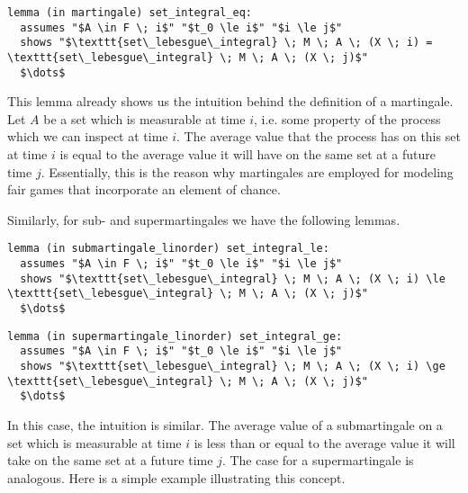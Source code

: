 \begin{isalemma}
{\small
\begin{lstlisting}[style=isabelle]
lemma (in martingale) set_integral_eq:
  assumes "$A \in F \; i$" "$t_0 \le i$" "$i \le j$"
  shows "$\texttt{set\_lebesgue\_integral} \; M \; A \; (X \; i) = \texttt{set\_lebesgue\_integral} \; M \; A \; (X \; j)$"
  $\dots$
\end{lstlisting}
}
\end{isalemma}

This lemma already shows us the intuition behind the definition of a martingale. Let $A$ be a set which is measurable at time $i$, i.e. some property of the process which we can inspect at time $i$. The average value that the process has on this set at time $i$ is equal to the average value it will have on the same set at a future time $j$. Essentially, this is the reason why martingales are employed for modeling fair games that incorporate an element of chance. 

Similarly, for sub- and supermartingales we have the following lemmas.

\begin{isalemma}
{\small
\begin{lstlisting}[style=isabelle]
lemma (in submartingale_linorder) set_integral_le:
  assumes "$A \in F \; i$" "$t_0 \le i$" "$i \le j$"
  shows "$\texttt{set\_lebesgue\_integral} \; M \; A \; (X \; i) \le \texttt{set\_lebesgue\_integral} \; M \; A \; (X \; j)$"
  $\dots$
\end{lstlisting}
}
\end{isalemma}

\begin{isalemma}
{\small
\begin{lstlisting}[style=isabelle]
lemma (in supermartingale_linorder) set_integral_ge:
  assumes "$A \in F \; i$" "$t_0 \le i$" "$i \le j$"
  shows "$\texttt{set\_lebesgue\_integral} \; M \; A \; (X \; i) \ge \texttt{set\_lebesgue\_integral} \; M \; A \; (X \; j)$"
  $\dots$
\end{lstlisting}
}
\end{isalemma}

In this case, the intuition is similar. The average value of a submartingale on a set which is measurable at time $i$ is less than or equal to the average value it will take on the same set at a future time $j$. The case for a supermartingale is analogous. Here is a simple example illustrating this concept.

